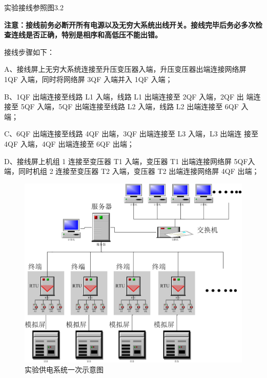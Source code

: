 \documentclass[a4paper]{ctexrep}
\begin{document}
                        实验接线参照图3.2
                        
                        \textbf{注意：接线前务必断开所有电源以及无穷大系统出线开关。接线完毕后务必多次检查连线是否正确，特别是相序和高低压不能出错。}

                        接线步骤如下： 
                        
                        A、接线屏上无穷大系统连接至升压变压器入端，升压变压器出端连接网络屏 1QF 入端，同时将网络屏 3QF 入端并入 1QF 入端； 
                        
                        B、1QF 出端连接至线路 L1 入端，线路 L1 出端连接至 2QF 入端，2QF 出 端连接至 5QF 入端，5QF 出端连接至线路 L2 入端，线路 L2 出端连接至 6QF 入端； 
                        
                        C、6QF 出端连接至线路 4QF 出端，3QF 出端连接至 L3 入端，L3 出端连 接至 4QF 入端，4QF 出端连接至 6QF 出端； 
                        
                        D、接线屏上机组 1 连接至变压器 T1 入端，变压器 T1 出端连接网络屏 5QF入端，同时机组 2 连接至变压器 T2 入端，变压器 T2 出端连接网络屏 4QF 出端；

                        \begin{figure}[htbp]
                            \centering
                            \includegraphics[width=12cm]{1.png}
                            \caption{实验供电系统一次示意图}
                        \end{figure}
        
\end{document}

